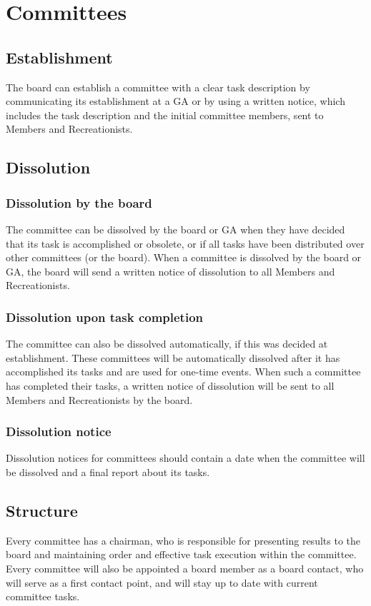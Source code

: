 \documentclass[a4paper]{article}
\begin{document}
\section{Committees}
\subsection{Establishment}
The board can establish a committee with a clear task description by communicating its establishment at a { GA} or by using a written notice, which includes the task description and the initial committee members, sent to { Members} and { Recreationists}.

\subsection{Dissolution}
\subsubsection{Dissolution by the board}
The committee can be dissolved by the board or { GA} when they have decided that its task is accomplished or obsolete, or if all tasks have been distributed over other committees (or the board). When a committee is dissolved by the board or { GA}, the board will send a written notice of dissolution to all { Members} and { Recreationists}.

\subsubsection{Dissolution upon task completion}
The committee can also be dissolved automatically, if this was decided at establishment. These committees will be automatically dissolved after it has accomplished its tasks and are used for one-time events. When such a committee has completed their tasks, a written notice of dissolution will be sent to all { Members} and { Recreationists} by the board.

\subsubsection{Dissolution notice}
Dissolution notices for committees should contain a date when the committee will be dissolved and a final report about its tasks.

\subsection{Structure}
Every committee has a chairman, who is responsible for presenting results to the board and maintaining order and effective task execution within the committee. Every committee will also be appointed a board member as a board contact, who will serve as a first contact point, and will stay up to date with current committee tasks.
\end{document}
